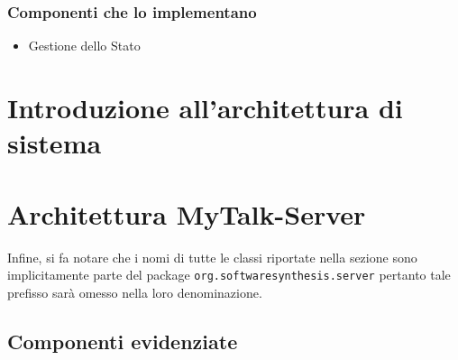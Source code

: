 \subsubsection{Componenti che lo implementano}
\begin{itemize}
\item Gestione dello Stato
\end{itemize}
\clearpage

\section{Introduzione all'architettura di sistema}
\clearpage

\section{Architettura MyTalk-Server}
Infine, si fa notare che i nomi di tutte le classi riportate nella sezione sono implicitamente parte del package \texttt{org.softwaresynthesis.server} pertanto tale prefisso sarà omesso nella loro denominazione.

\subsection{Componenti evidenziate}

